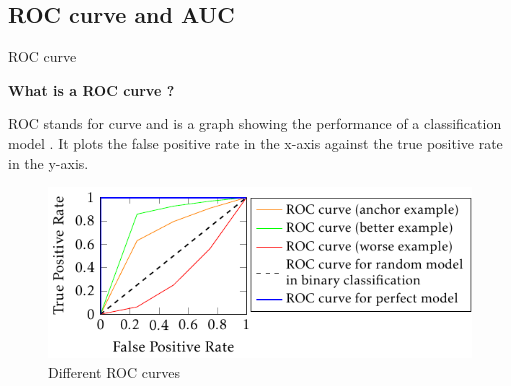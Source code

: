 \subsection{ROC curve and AUC}
\begin{frame}{ROC curve}
    
    {\large\textbf{What is a ROC curve ?}}
    
    ROC stands for  curve and is a graph showing the performance of a classification model . It plots the false positive rate in the x-axis against the true positive rate in the y-axis. 

    \begin{figure}
        \centering
        \includegraphics[page=1]{images/output-figure0.pdf}
        \caption{Different ROC curves}
    \end{figure}
    

\end{frame}
